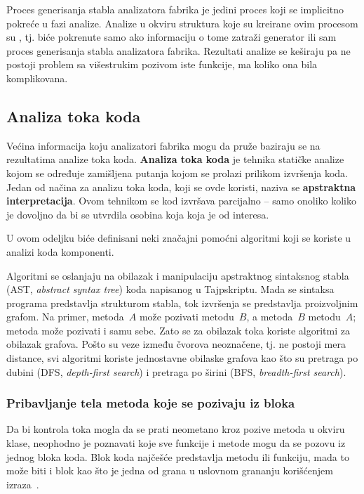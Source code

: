 Proces generisanja stabla analizatora fabrika je jedini proces koji se implicitno pokreće u fazi analize.
Analize u okviru struktura koje su kreirane ovim procesom su , tj. biće pokrenute samo ako informaciju o tome zatraži generator ili sam proces generisanja stabla analizatora fabrika.
Rezultati analize se keširaju pa ne postoji problem sa višestrukim pozivom iste funkcije, ma koliko ona bila komplikovana.

\subsection{Analiza toka koda}

Većina informacija koju analizatori fabrika mogu da pruže baziraju se na rezultatima analize toka koda.
\textbf{Analiza toka koda} je tehnika statičke analize kojom se određuje zamišljena putanja kojom se prolazi prilikom izvršenja koda.
Jedan od načina za analizu toka koda, koji se ovde koristi, naziva se \textbf{apstraktna interpretacija}.
Ovom tehnikom se kod izvršava parcijalno -- samo onoliko koliko je dovoljno da bi se utvrdila osobina koja koja je od interesa.

U ovom odeljku biće definisani neki značajni pomoćni algoritmi koji se koriste u analizi koda komponenti.

Algoritmi se oslanjaju na obilazak i manipulaciju apstraktnog sintaksnog stabla (AST, \textsl{abstract syntax tree}) koda napisanog u Tajpskriptu.
Mada se sintaksa programa predstavlja strukturom stabla, tok izvršenja se predstavlja proizvoljnim grafom.
Na primer, metoda~$A$ može pozivati metodu~$B$, a metoda~$B$ metodu~$A$; metoda može pozivati i samu sebe.
Zato se za obilazak toka koriste algoritmi za obilazak grafova.
Pošto su veze između čvorova neoznačene, tj. ne postoji mera distance, svi algoritmi koriste jednostavne obilaske grafova kao što su pretraga po dubini (DFS, \textsl{depth-first search}) i pretraga po širini (BFS, \textsl{breadth-first search}).

\subsubsection{Pribavljanje tela metoda koje se pozivaju iz bloka}\label{sec:algo:get-bodies-called-from}

Da bi kontrola toka mogla da se prati neometano kroz pozive metoda u okviru klase, neophodno je poznavati koje sve funkcije i metode mogu da se pozovu iz jednog bloka koda.
Blok koda najčešće predstavlja metodu ili funkciju, mada to može biti i blok kao što je jedna od grana u uslovnom grananju korišćenjem izraza~.

